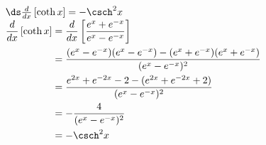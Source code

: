 {$\ds\frac{d}{dx}\left[\coth x\right] = -\csch^2x$}
{\hfill$\begin{aligned}[t]
		\frac{d}{dx}\left[\coth x\right] &= \frac{d}{dx}\left[\frac{e^x+e^{-x}}{e^x-e^{-x}}\right]  \\
											&= \frac{(e^x-e^{-x})(e^x-e^{-x})-(e^x+e^{-x})(e^x+e^{-x})}{(e^x-e^{-x})^2}\\
											&= \frac{e^{2x}+e^{-2x} - 2 - (e^{2x}+e^{-2x}+2)}{(e^x-e^{-x})^2}\\
											&= -\frac{4}{(e^x-e^{-x})^2}\\
											&=-\csch^2x
\end{aligned}$\hfill\null}
